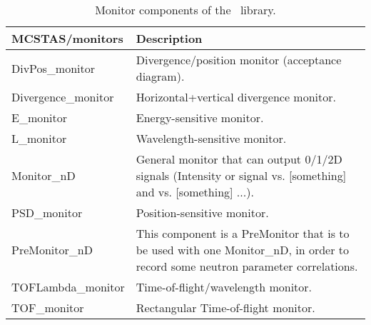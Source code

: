 \begin{table}
  \begin{center}
    {\let\my=\\
    \begin{tabular}{|p{}|p{}|}
      \hline
       {\bf MCSTAS/monitors} & Description \\
       \hline
DivPos\_monitor  &    Divergence/position monitor (acceptance diagram). \\
Divergence\_monitor &  Horizontal+vertical
                    divergence monitor. \\
E\_monitor       &    Energy-sensitive monitor. \\
L\_monitor        &  Wavelength-sensitive monitor. \\
Monitor\_nD      &   General monitor that can output
                    0/1/2D signals (Intensity or signal vs. [something]
                    and vs. [something] ...). \\
PSD\_monitor     &    Position-sensitive monitor. \\
PreMonitor\_nD    &   This component is a PreMonitor that is to be
                    used with one Monitor\_nD,
                    in order to record some neutron parameter correlations. \\
TOFLambda\_monitor &  Time-of-flight/wavelength monitor. \\
TOF\_monitor     &    Rectangular Time-of-flight monitor. \\
      \hline
    \end{tabular}
    \caption{Monitor components of the \MCS\ library.}
    \label{t:comp-monitors}
    }
  \end{center}
\end{table}

